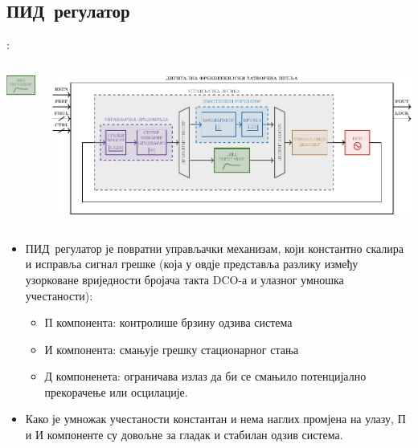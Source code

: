 \documentclass[aspectratio=169]{beamer}
\def \PIDctrlColor     {OliveGreen}
\def \DCO  {DCO} %
\def \PID  {ПИД} %
\begin{document}
\subsection{\PID\ регулатор}

\begin{frame}{\secname: \subsecname}
	\vspace{-0.6cm}
	\begin{columns}[t]
        \begin{column}{0.25\linewidth}
        	\begin{center}
	        	\vspace{0.4cm}
	            \includegraphics[scale=1.82]{slike/prezentacija/PID_CTRL.pdf} 
	        \end{center}
        \end{column}
        \begin{column}{0.75\linewidth}
        	\begin{center}
            	\includegraphics[scale=0.5]{slike/prezentacija/FLL.pdf}
            \end{center}
        \end{column}
    \end{columns}
    \medskip
	\begin{itemize}
		\item \PID\ регулатор је повратни управљачки механизам, који константно скалира и исправља сигнал грешке (која у овдје представља разлику између узорковане вриједности бројача такта \DCO-а и улазног умношка учестаности):
		\begin{itemize}
			\color{\PIDctrlColor}
			\item П компонента: контролише брзину одзива система
			\item И компонента: смањује грешку стационарног стања
			\item Д компоненета: ограничава излаз да би се смањило потенцијално прекорачење или осцилације. 
		\end{itemize}
		\smallskip
		\item Како је умножак учестаности константан и нема наглих промјена на улазу, П и И компоненте су довољне за гладак и стабилан одзив система.
	\end{itemize}
\end{frame}
\end{document}
